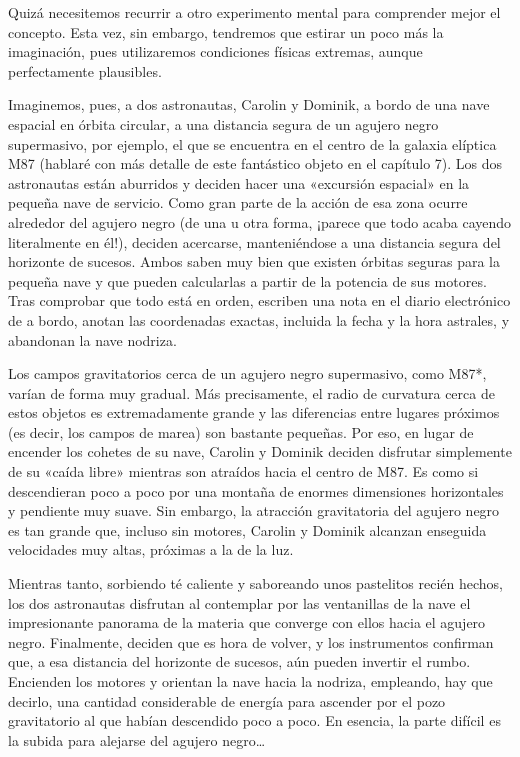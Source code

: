 Quizá necesitemos recurrir a otro experimento mental para comprender mejor el concepto. Esta vez, sin embargo, tendremos que estirar un poco más la imaginación, pues utilizaremos condiciones físicas extremas, aunque perfectamente plausibles.

Imaginemos, pues, a dos astronautas, Carolin y Dominik, a bordo de una nave espacial en órbita circular, a una distancia segura de un agujero negro supermasivo, por ejemplo, el que se encuentra en el centro de la galaxia elíptica M87 (hablaré con más detalle de este fantástico objeto en el capítulo 7). Los dos astronautas están aburridos y deciden hacer una «excursión espacial» en la pequeña nave de servicio. Como gran parte de la acción de esa zona ocurre alrededor del agujero negro (de una u otra forma, ¡parece que todo acaba cayendo literalmente en él!), deciden acercarse, manteniéndose a una distancia segura del horizonte de sucesos. Ambos saben muy bien que existen órbitas seguras para la pequeña nave y que pueden calcularlas a partir de la potencia de sus motores. Tras comprobar que todo está en orden, escriben una nota en el diario electrónico de a bordo, anotan las coordenadas exactas, incluida la fecha y la hora astrales, y abandonan la nave nodriza.

Los campos gravitatorios cerca de un agujero negro supermasivo, como M87*, varían de forma muy gradual. Más precisamente, el radio de curvatura cerca de estos objetos es extremadamente grande y las diferencias entre lugares próximos (es decir, los campos de marea) son bastante pequeñas. Por eso, en lugar de encender los cohetes de su nave, Carolin y Dominik deciden disfrutar simplemente de su «caída libre» mientras son atraídos hacia el centro de M87. Es como si descendieran poco a poco por una montaña de enormes dimensiones horizontales y pendiente muy suave. Sin embargo, la atracción gravitatoria del agujero negro es tan grande que, incluso sin motores, Carolin y Dominik alcanzan enseguida velocidades muy altas, próximas a la de la luz.

Mientras tanto, sorbiendo té caliente y saboreando unos pastelitos recién hechos, los dos astronautas disfrutan al contemplar por las ventanillas de la nave el impresionante panorama de la materia que converge con ellos hacia el agujero negro. Finalmente, deciden que es hora de volver, y los instrumentos confirman que, a esa distancia del horizonte de sucesos, aún pueden invertir el rumbo. Encienden los motores y orientan la nave hacia la nodriza, empleando, hay que decirlo, una cantidad considerable de energía para ascender por el pozo gravitatorio al que habían descendido poco a poco. En esencia, la parte difícil es la subida para alejarse del agujero negro…

